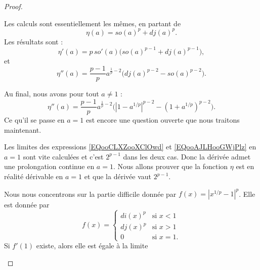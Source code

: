 \begin{proof}
\begin{subproof}
			\spitem[Pour \( a>1\)]
			Les calculs sont essentiellement les mêmes, en partant de
			\begin{equation}
				\eta(a)=so(a)^p+dj(a)^p.
			\end{equation}
			Les résultats sont :
			\begin{equation}    \label{EQooAJLHooGWjPlz}
				\eta'(a)=p\,so'(a)\big( so(a)^{p-1}+dj(a)^{p-1} \big),
			\end{equation}
			et
			\begin{equation}
				\eta''(a)=\frac{ p-1 }{ p }a^{\frac{1}{ p }-2}\big( dj(a)^{p-2}-so(a)^{p-2} \big).
			\end{equation}


			Au final, nous avons pour tout \( a\neq 1\) :
			\begin{equation}
				\eta''(a)=\frac{ p-1 }{ p }a^{\frac{1}{ p }-2}\big( | 1-a^{1/p} |^{p-2}-(1+a^{1/p})^{p-2} \big).
			\end{equation}
			Ce qu'il se passe en \( a=1\) est encore une question ouverte que nous traitons maintenant.

			\spitem[Pour \( a=1\)]

			Les limites des expressions \eqref{EQooCLXZooXClOwd} et \eqref{EQooAJLHooGWjPlz} en \( a=1\) sont vite calculées et c'est \( 2^{p-1}\) dans les deux cas. Donc la dérivée admet une prolongation continue en \( a=1\). Nous allons prouver que la fonction \( \eta\) est en réalité dérivable en \( a=1\) et que la dérivée vaut \( 2^{p-1}\).

			Nous nous concentrons sur la partie difficile donnée par \( f(x)=| x^{1/p}-1 |^p\). Elle est donnée par
			\begin{equation}
				f(x)=\begin{cases}
					di(x)^p & \text{si } x<1  \\
					dj(x)^p & \text{si } x>1  \\
					0       & \text{si } x=1.
				\end{cases}
			\end{equation}
			Si \( f'(1)\) existe, alors elle est égale à la limite


\end{subproof}
\end{proof}
